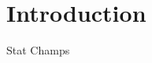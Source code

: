 \documentclass[journal,onecolumn]{IEEEtran}
\begin{document}





\renewcommand*\contentsname{Table of Contents}


\maketitle



%
\IEEEpeerreviewmaketitle

\newpage

\tableofcontents

\newpage


\section{Introduction}
% 
% 
% 
% 

\hfill Stat Champs
 
\end{document}
